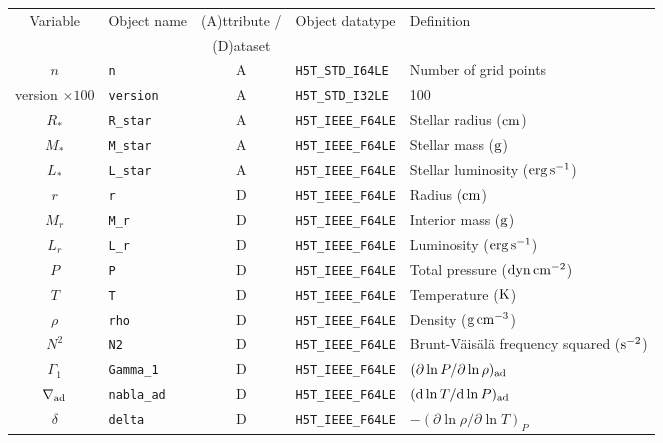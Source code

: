 \documentclass{article}
\newcommand{\diff}{\ensuremath{{\rm d}}}
\newcommand{\Rstar}{\ensuremath{R_{\ast}}}
\newcommand{\Mstar}{\ensuremath{M_{\ast}}}
\newcommand{\Lstar}{\ensuremath{L_{\ast}}}
\newcommand{\cm}{\ensuremath{{\rm cm}}}
\newcommand{\gram}{\ensuremath{{\rm g}}}
\newcommand{\second}{\ensuremath{{\rm s}}}
\newcommand{\dyne}{\ensuremath{{\rm dyn}}}
\newcommand{\erg}{\ensuremath{{\rm erg}}}
\newcommand{\kelvin}{\ensuremath{{\rm K}}}
\begin{document}
\begin{table}[h!]
\begin{tabular}{|c|l|c|l|l|} \hline
Variable & Object name & (A)ttribute / & Object datatype & Definition \\
&             & (D)ataset     &                 &            \\ \hline
$n$               & \texttt{n}            & A &\texttt{H5T\_STD\_I64LE}  & Number of grid points \\ 
version $\times 100$ & \texttt{version}   & A & \texttt{H5T\_STD\_I32LE}  & 100 \\
\Rstar            & \texttt{R\_star}      & A & \texttt{H5T\_IEEE\_F64LE} & Stellar radius ($\cm$) \\
\Mstar            & \texttt{M\_star}      & A & \texttt{H5T\_IEEE\_F64LE} & Stellar mass ($\gram$) \\
\Lstar            & \texttt{L\_star}      & A & \texttt{H5T\_IEEE\_F64LE} & Stellar luminosity ($\erg\,\second^{-1}$) \\
$r$               & \texttt{r}            & D & \texttt{H5T\_IEEE\_F64LE} & Radius ($\cm$) \\
$M_{r}$           & \texttt{M\_r}            & D & \texttt{H5T\_IEEE\_F64LE} & Interior mass ($\gram$) \\
$L_{r}$           & \texttt{L\_r}         & D & \texttt{H5T\_IEEE\_F64LE} & Luminosity ($\erg\,\second^{-1}$) \\
$P$               & \texttt{P}            & D & \texttt{H5T\_IEEE\_F64LE} & Total pressure ($\dyne\,\cm^{-2}$) \\
$T$               & \texttt{T}            & D & \texttt{H5T\_IEEE\_F64LE} & Temperature ($\kelvin$) \\
$\rho$            & \texttt{rho}          & D & \texttt{H5T\_IEEE\_F64LE} & Density ($\gram\,\cm^{-3}$) \\
$N^{2}$           & \texttt{N2}           & D & \texttt{H5T\_IEEE\_F64LE} & Brunt-V\"ais\"al\"a frequency squared ($\second^{-2}$) \\
$\Gamma_{1}$      & \texttt{Gamma\_1}      & D & \texttt{H5T\_IEEE\_F64LE} & $(\partial \ln P/\partial \ln \rho)_{\rm ad}$ \\
$\nabla_{\rm ad}$  & \texttt{nabla\_ad}      & D & \texttt{H5T\_IEEE\_F64LE} & $(\diff \ln T/\diff \ln P)_{\rm ad}$ \\
$\delta$          & \texttt{delta}            & D & \texttt{H5T\_IEEE\_F64LE} & $-(\partial \ln \rho/\partial \ln T)_{P}$  \\

\end{tabular}
\end{table}
\end{document}
